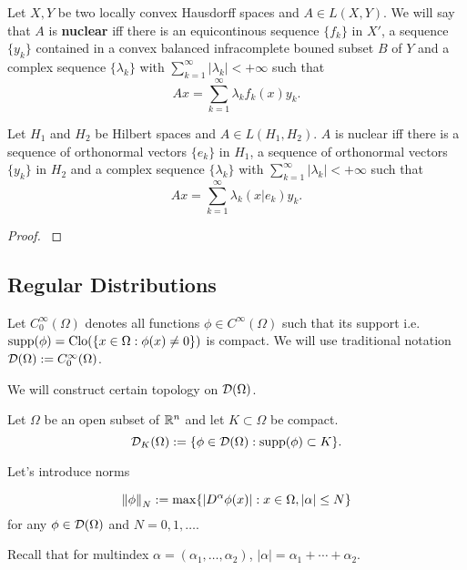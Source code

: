 \documentclass[main.tex]{subfiles}
\begin{document}
\begin{definition}
Let $X, Y$ be two locally convex Hausdorff spaces and $A\in L(X, Y)$.
We will say that $A$ is \textbf{nuclear} iff
there is an equicontinous sequence $\{f_k\}$ in $X'$, a sequence $\{y_k\}$ contained in a convex balanced infracomplete bouned subset $B$ of $Y$ and a complex sequence $\{\lambda_k\}$ with $\sum_{k=1}^\infty |\lambda_k| < + \infty$ such that
\begin{equation}
A x = \sum_{k=1}^\infty  \lambda_k f_k(x)y_k.
\end{equation}
\end{definition}
\begin{theorem}
Let $H_1$ and $H_2$ be Hilbert spaces and $A\in L(H_1, H_2)$. $A$ is nuclear iff
there is a sequence of orthonormal vectors $\{e_k\}$ in $H_1$, a sequence of orthonormal vectors $\{y_k\}$ in $H_2$ and a complex sequence $\{\lambda_k\}$ with $\sum_{k=1}^\infty |\lambda_k| < + \infty$ such that
\begin{equation}
A x = \sum_{k=1}^\infty  \lambda_k (x|e_k)y_k.
\end{equation}
\end{theorem} 
\begin{proof}
\cite[See][48.7]{treves1970}
\end{proof}

\subsection{Regular Distributions}

Let $C^\infty_0(\Omega)$ denotes all functions $\phi\in C^\infty(\Omega)$ such that its support i.e. $\text{supp}(\phi) = \text{Clo}(\{x\in \Omega: \phi(x)\not=0\})$ is compact.
We will use traditional notation $\mathcal{D}(\Omega):=C^\infty_0(\Omega)$.

We will construct certain topology on $\mathcal{D}(\Omega)$.

\begin{definition}
Let $\Omega$ be an open subset of $\mathbb{R}^n$ and let $K\subset \Omega$ be compact.
\begin{equation} 
\mathcal{D}_K(\Omega) := \{\phi\in\mathcal{D}(\Omega): \text{supp}(\phi)\subset K\}. 
\end{equation}
\end{definition}
Let's introduce norms
\begin{definition}
\begin{equation}
\norm{\phi}_N := \max\{|D^\alpha \phi(x)|: x\in\Omega, |\alpha| \leq N \}
\end{equation}
for any $\phi\in\mathcal{D}(\Omega)$ and $N=0,1, \dots$.
\end{definition}
Recall that for multindex $\alpha = (\alpha_1, \dots, \alpha_2)$, $|\alpha| = \alpha_1 + \cdots + \alpha_2$.
\end{document}
